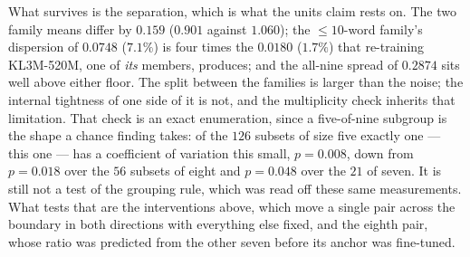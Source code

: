 What survives is the separation, which is what the units claim rests on. The two family means differ
by $0.159$ ($0.901$ against $1.060$); the $\le 10$-word family's dispersion of $0.0748$ ($7.1\%$) is
four times the $0.0180$ ($1.7\%$) that re-training KL3M-520M, one of \emph{its} members, produces;
and the all-nine spread of $0.2874$ sits well above either floor. The split between the families is
larger than the noise; the internal tightness of one side of it is not, and the multiplicity check
inherits that limitation. That check is an exact enumeration, since a five-of-nine subgroup is the
shape a chance finding takes: of the $126$ subsets of size five exactly one --- this one --- has a
coefficient of variation this small, $p = 0.008$, down from $p = 0.018$ over the $56$ subsets of
eight and $p = 0.048$ over the $21$ of seven. It is still not a test of the grouping rule, which was
read off these same measurements. What tests that are the interventions above, which move a single
pair across the boundary in both directions with everything else fixed, and the eighth pair, whose
ratio was predicted from the other seven before its anchor was fine-tuned.